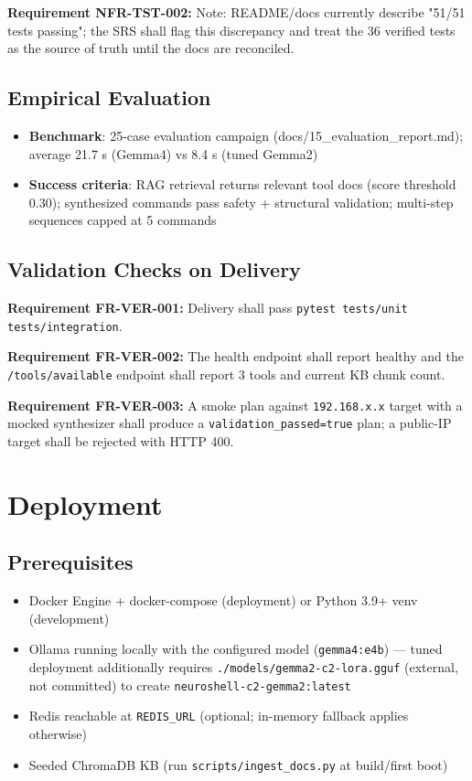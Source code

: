 \documentclass[10pt,journal,onecolumn]{IEEEtran}
\newcommand{\reqid}[1]{\textbf{#1}}
\begin{document}
\reqid{Requirement NFR-TST-002:} Note: README/docs currently describe "51/51 tests passing"; the SRS shall flag this discrepancy and treat the 36 verified tests as the source of truth until the docs are reconciled.

\subsection{Empirical Evaluation}

\begin{itemize}
\item \textbf{Benchmark}: 25-case evaluation campaign (docs/15\_evaluation\_report.md); average 21.7 s (Gemma4) vs 8.4 s (tuned Gemma2)
\item \textbf{Success criteria}: RAG retrieval returns relevant tool docs (score threshold 0.30); synthesized commands pass safety + structural validation; multi-step sequences capped at 5 commands
\end{itemize}

\subsection{Validation Checks on Delivery}

\reqid{Requirement FR-VER-001:} Delivery shall pass \texttt{pytest tests/\allowbreak unit tests/\allowbreak integration}.

\reqid{Requirement FR-VER-002:} The health endpoint shall report healthy and the \texttt{/tools/available} endpoint shall report 3 tools and current KB chunk count.

\reqid{Requirement FR-VER-003:} A smoke plan against \texttt{192.168.x.x} target with a mocked synthesizer shall produce a \texttt{validation\_passed=true} plan; a public-IP target shall be rejected with HTTP 400.

\section{Deployment}

\subsection{Prerequisites}

\begin{itemize}
\item Docker Engine + docker-compose (deployment) or Python 3.9+ venv (development)
\item Ollama running locally with the configured model (\texttt{gemma4:e4b}) --- tuned deployment additionally requires \texttt{.\allowbreak /\allowbreak models/\allowbreak gemma2-\allowbreak c2-\allowbreak lora.\allowbreak gguf} (external, not committed) to create \texttt{neuroshell-\allowbreak c2-\allowbreak gemma2:\allowbreak latest}
\item Redis reachable at \texttt{REDIS\_URL} (optional; in-memory fallback applies otherwise)
\item Seeded ChromaDB KB (run \texttt{scripts/ingest\_docs.py} at build/first boot)
\end{itemize}
\end{document}

